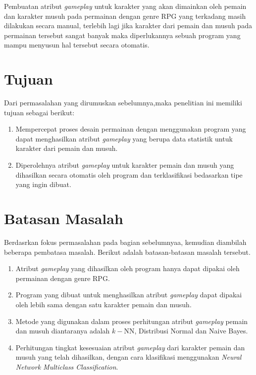 Pembuatan atribut \textit{gameplay} untuk karakter yang akan dimainkan oleh pemain dan karakter musuh pada permainan dengan genre RPG yang terkadang masih dilakukan secara manual, terlebih lagi jika karakter dari pemain dan musuh pada permainan tersebut sangat banyak maka diperlukannya sebuah program yang mampu menyusun hal tersebut secara otomatis.
\vspace{1ex}

\section{Tujuan}
\vspace{1ex}

Dari permasalahan yang dirumuskan sebelumnya,maka penelitian ini memiliki tujuan sebagai berikut: 

\begin{enumerate}
	\item Mempercepat proses desain permainan dengan menggunakan program yang dapat menghasilkan atribut \textit{gameplay} yang berupa data statistik untuk karakter dari pemain dan musuh.

	\item Diperolehnya atribut \textit{gameplay} untuk karakter pemain dan musuh yang dihasilkan secara otomatis oleh program dan terklasifikasi bedasarkan tipe yang ingin dibuat.
\end{enumerate}

\section{Batasan Masalah}
\vspace{1ex}

Berdasrkan fokus permasalahan pada bagian sebelumnyaa, kemudian diambilah beberapa pembatasa masalah. Berikut adalah batasan-batasan masalah tersebut.

\begin{enumerate}
	\item Atribut \textit{gameplay} yang dihasilkan oleh program hanya dapat dipakai oleh permainan dengan genre RPG.
	
	\item Program yang dibuat untuk menghasilkan atribut \textit{gameplay} dapat dipakai oleh lebih sama dengan satu karakter pemain dan musuh.

	\item Metode yang digunakan dalam proses perhitungan atribut \textit{gameplay} pemain dan musuh diantaranya adalah $k-$NN, Distribusi Normal dan Naive Bayes.
	
	\item Perhitungan tingkat kesesuaian atribut \textit{gameplay} dari karakter pemain dan musuh yang telah dihasilkan, dengan cara klasifikasi menggunakan \textit{Neural Network Multiclass Classification}.
\end{enumerate}

